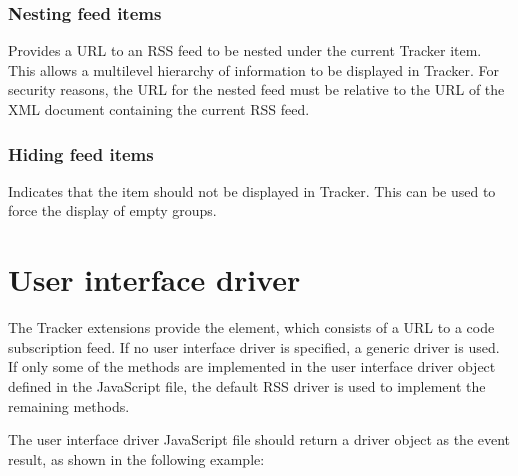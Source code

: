 \documentclass[letterpaper,12pt,english,openany,oneside]{sphinxmanual}
\begin{document}
\subsubsection{Nesting feed items}
\label{\detokenize{Tracker_InboxAPI:nesting-feed-items}}
\begin{sphinxVerbatim}[commandchars=\\\{\}]
\end{sphinxVerbatim}

Provides a URL to an RSS feed to be nested under the current Tracker item. This allows a multi\sphinxhyphen{}level hierarchy of information to be displayed in Tracker. For security reasons, the URL for the nested feed must be relative to the URL of the XML document containing the current RSS feed.




\subsubsection{Hiding feed items}
\label{\detokenize{Tracker_InboxAPI:hiding-feed-items}}
\begin{sphinxVerbatim}[commandchars=\\\{\}]
\end{sphinxVerbatim}

Indicates that the item should not be displayed in Tracker. This can be used to force the display of empty groups.




\section{User interface driver}
\label{\detokenize{Tracker_InboxAPI:user-interface-driver}}
The Tracker extensions provide the  element, which consists of a URL to a code subscription feed. If no user interface driver is specified, a generic driver is used. If only some of the methods are implemented in the user interface driver object defined in the JavaScript file, the default RSS driver is used to implement the remaining methods.

The user interface driver JavaScript file should return a driver object as the event result, as shown in the following example:

\begin{sphinxVerbatim}[commandchars=\\\{\}]
          
   
\end{sphinxVerbatim}
\end{document}
